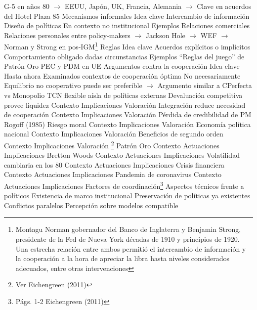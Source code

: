 \documentclass{nuevotema}
\begin{document}
\begin{esquemal}
				\4[] G-5 en años 80
				\4[] $\to$ EEUU, Japón, UK, Francia, Alemania
				\4[] $\to$ Clave en acuerdos del Hotel Plaza 85
			\3 Mecanismos informales
				\4 Idea clave
				\4[] Intercambio de información
				\4[] Diseño de políticas
				\4[] En contexto no institucional
				\4 Ejemplos
				\4[] Relaciones comerciales
				\4[] Relaciones personales entre policy-makers
				\4[] $\to$ Jackson Hole
				\4[] $\to$ WEF
				\4[] $\to$ Norman y Strong en pos-IGM\footnote{Montagu Norman gobernador del Banco de Inglaterra y Benjamin Strong, presidente de la Fed de Nueva York décadas de 1910 y principios de 1920. Una estrecha relación entre ambos permitió el intercambio de información y la cooperación a la hora de apreciar la libra hasta niveles considerados adecuados, entre otras intervenciones}
			\3 Reglas
				\4 Idea clave
				\4[] Acuerdos explícitos o implícitos
				\4[] Comportamiento obligado dadas circunstancias
				\4 Ejemplos
				\4[] ``Reglas del juego'' de Patrón Oro
				\4[] PEC y PDM en UE
				\4[]
		\2 Argumentos contra la cooperación
			\3 Idea clave
				\4 Hasta ahora
				\4[] Examinados contextos de cooperación óptima
				\4 No necesariamente
				\4[] Equilibrio no cooperativo puede ser preferible
				\4[] $\to$ Argumento similar a CPerfecta vs Monopolio
			\3 TCN flexible aísla de políticas externas
				\4
			\3 Devaluación competitiva provee liquidez
				\4 Contexto
				\4 Implicaciones
				\4 Valoración
			\3 Integración reduce necesidad de cooperación
				\4 Contexto
				\4 Implicaciones
				\4 Valoración
			\3 Pérdida de credibilidad de PM
				\4 Rogoff (1985)
			\3 Riesgo moral
				\4 Contexto
				\4 Implicaciones
				\4 Valoración
			\3 Economía política nacional
				\4 Contexto
				\4 Implicaciones
				\4 Valoración
			\3 Beneficios de segundo orden
				\4 Contexto
				\4 Implicaciones
				\4 Valoración
	\1 \footnote{Ver Eichengreen (2011)}
		\2 Patrón Oro
			\3 Contexto
			\3 Actuaciones
			\3 Implicaciones
		\2 Bretton Woods
			\3 Contexto
			\3 Actuaciones
			\3 Implicaciones
		\2 Volatilidad cambiaria en los 80
			\3 Contexto
			\3 Actuaciones
			\3 Implicaciones
		\2 Crisis financiera
			\3 Contexto
			\3 Actuaciones
			\3 Implicaciones
		\2 Pandemia de coronavirus
			\3 Contexto
			\3 Actuaciones
			\3 Implicaciones
		\2 Factores de coordinación\footnote{Págs. 1-2 Eichengreen (2011)}
			\3 Aspectos técnicos frente a políticos
			\3 Existencia de marco institucional
			\3 Preservación de políticas ya existentes
			\3 Conflictos paralelos
			\3 Percepción sobre modelos compatible
	\1[] 

\end{esquemal}
\end{document}
